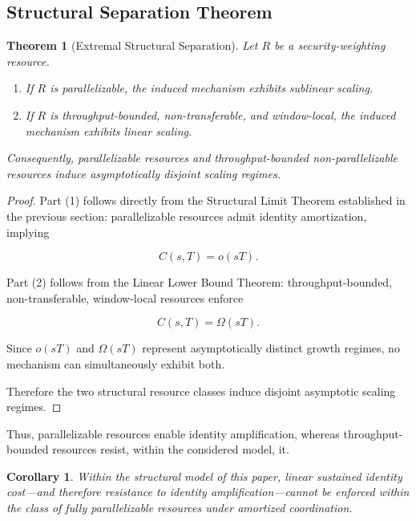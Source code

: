 \documentclass[journal]{IEEEtran}
\newtheorem{theorem}{Theorem}
\newtheorem{corollary}{Corollary}
\begin{document}
	\subsection{Structural Separation Theorem}
	
	\begin{theorem}[Extremal Structural Separation]
		
		Let $R$ be a security-weighting resource.
		
		\begin{enumerate}
			
			\item If $R$ is parallelizable,
			the induced mechanism exhibits sublinear scaling.
			
			\item If $R$ is throughput-bounded, non-transferable,
			and window-local,
			the induced mechanism exhibits linear scaling.
			
		\end{enumerate}
		
		Consequently,
		parallelizable resources and throughput-bounded
		non-parallelizable resources induce
		asymptotically disjoint scaling regimes.
		
	\end{theorem}
	
	\begin{proof}
		
		Part (1) follows directly from the Structural Limit Theorem
		established in the previous section:
		parallelizable resources admit identity amortization,
		implying
		
		\[
		C(s,T) = o(sT).
		\]
		
		Part (2) follows from the Linear Lower Bound
		Theorem:
		throughput-bounded, non-transferable,
		window-local resources enforce
		
		\[
		C(s,T) = \Omega(sT).
		\]
		
		Since $o(sT)$ and $\Omega(sT)$ represent
		asymptotically distinct growth regimes,
		no mechanism can simultaneously exhibit both.
		
		Therefore the two structural resource classes
		induce disjoint asymptotic scaling regimes.
		
	\end{proof}
	
	Thus, parallelizable resources enable identity amplification,
	whereas throughput-bounded resources resist, within the considered model, it.
	
	\begin{corollary}
		Within the structural model of this paper,
		linear sustained identity cost---and therefore
		resistance to identity amplification---cannot be
		enforced within the class of fully parallelizable resources
		under amortized coordination.
	\end{corollary}
	
\end{document}
